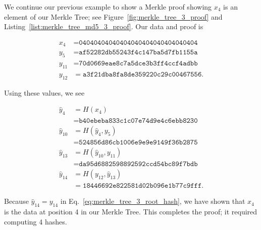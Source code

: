 \begin{example}

We continue our previous example to show a Merkle proof showing
$x_{4}$ is an element of our Merkle Tree;
see Figure~\ref{fig:merkle_tree_3_proof}
and Listing~\ref{list:merkle_tree_md5_3_proof}.
Our data and proof is



\begin{align}
    x_{4}  &= \texttt{04040404040404040404040404040404}
        \nonumber\\
    y_{5}  &= \texttt{af52282db55243f4c147ba5d7fb1155a}
        \nonumber\\
    y_{11} &= \texttt{70d0669eae8c7a5dce3b3ff4ccf4adbb}
        \nonumber\\
    y_{12} &= \texttt{a3f21dba8fa8de359220c29c00467556}.
\end{align}

\noindent
Using these values, we see

\begin{align}
    \hat{y}_{4}  &= H(x_{4}) \nonumber\\
        &= \texttt{b40ebeba833c1c07e74d9e4c6ebb8230}
            \nonumber\\
    \hat{y}_{10} &= H(\hat{y}_{4}, y_{5}) \nonumber\\
        &= \texttt{524856d86cb1006e9e9e9149f36b2875}
            \nonumber\\
    \hat{y}_{13} &= H(\hat{y}_{10}, y_{11}) \nonumber\\
        &= \texttt{da95d6882598892592ccd54bc89f7bdb
            }
            \nonumber\\
    \hat{y}_{14} &= H(y_{12}, \hat{y}_{13}) \nonumber\\
        &= \texttt{18446692e822581d02b096e1b77c9fff}.
\end{align}

\noindent
Because $\hat{y}_{14} = y_{14}$ in Eq.~\eqref{eq:merkle_tree_3_root_hash},
we have shown that $x_{4}$ is the data at position 4 in our Merkle Tree.
This completes the proof;
it required computing 4 hashes.
\end{example}

